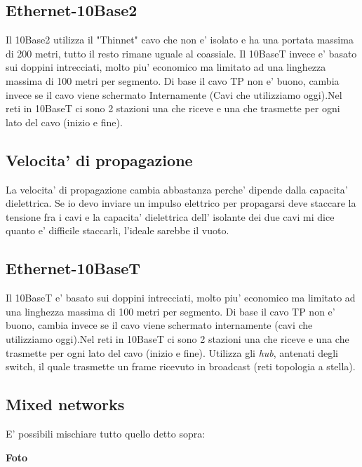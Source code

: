 \subsection{Ethernet-10Base2}
Il 10Base2 utilizza il "Thinnet" cavo che non e' isolato e ha una portata massima di 200 metri, tutto il resto rimane uguale al coassiale. Il 10BaseT invece e' basato sui doppini intrecciati, molto piu' economico ma limitato ad una linghezza massima di 100 metri per segmento. Di base il cavo TP non e' buono, cambia invece se il cavo viene schermato Internamente (Cavi che utilizziamo oggi).Nel reti in 10BaseT ci sono 2 stazioni una che riceve e una che trasmette per ogni lato del cavo (inizio e fine).
\subsection{Velocita' di propagazione}
La velocita' di propagazione cambia abbastanza perche' dipende dalla capacita' dielettrica. Se io devo inviare un impulso elettrico per propagarsi deve staccare la tensione fra i cavi e la capacita' dielettrica dell' isolante dei due cavi mi dice quanto e' difficile staccarli, l'ideale sarebbe il vuoto.
\subsection{Ethernet-10BaseT}
Il 10BaseT e' basato sui doppini intrecciati, molto piu' economico ma limitato ad una linghezza massima di 100 metri per segmento. Di base il cavo TP non e' buono, cambia invece se il cavo viene schermato internamente (cavi che utilizziamo oggi).Nel reti in 10BaseT ci sono 2 stazioni una che riceve e una che trasmette per ogni lato del cavo (inizio e fine). Utilizza gli \textit{hub}, antenati degli switch, il quale trasmette un frame ricevuto in broadcast (reti topologia a stella).
\subsection{Mixed networks}
E' possibili mischiare tutto quello detto sopra:
\begin{example}
  \textbf{Foto}
\end{example}
